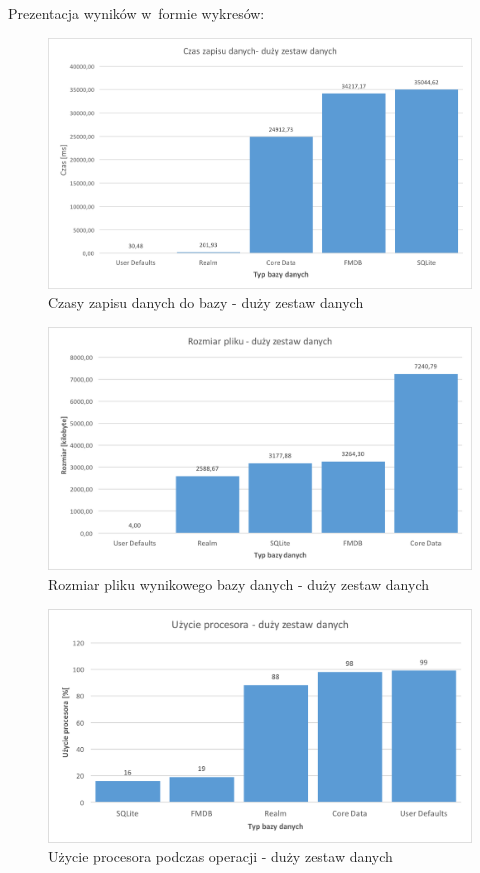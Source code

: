 \newpage

Prezentacja wyników w~formie wykresów: 

\begin{figure}[H]
\centering
	\includegraphics[width=13.5cm]{img/save_data/save_speed_big.png}
	\caption{Czasy zapisu danych do bazy - duży zestaw danych}
	\label{fig: big-save-time}
\end{figure}

\begin{figure}[H]
\centering
	\includegraphics[width=13.5cm]{img/save_data/save_file_big.png}
	\caption{Rozmiar pliku wynikowego bazy danych - duży zestaw danych}
	\label{fig: big-save-file-size}
\end{figure}

\begin{figure}[H]
\centering
	\includegraphics[width=15cm]{img/save_data/save_cpu_big.png}
	\caption{Użycie procesora podczas operacji - duży zestaw danych}
	\label{fig: big-save-cpu}
\end{figure}

